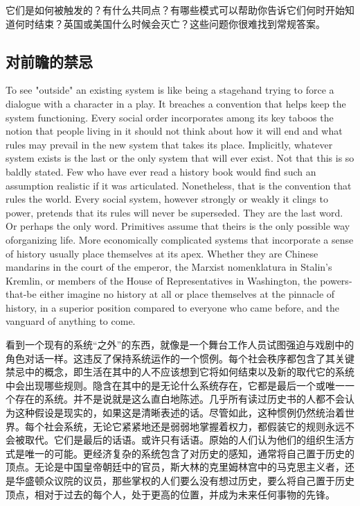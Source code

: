 \begin{Parallel}{97mm}{45mm}
  \ParallelRText
  {它们是如何被触发的？有什么共同点？有哪些模式可以帮助你告诉它们何时开始知道何时结束？英国或美国什么时候会灭亡？这些问题你很难找到常规答案。}

 \ParallelPar  

\subsection{对前瞻的禁忌}

  \ParallelLText
  {To see "outside" an existing system is like being a stagehand trying to force a dialogue with a character in a play. It breaches a convention that helps keep the system functioning. Every social order incorporates among its key taboos the notion that people living in it should not think about how it will end and what rules may prevail in the new system that takes its place. Implicitly, whatever system exists is the last or the only system that will ever exist. Not that this is so baldly stated. Few who have ever read a history book would find such an assumption realistic if it was articulated. Nonetheless, that is the convention that rules the world. Every social system, however strongly or weakly it clings to power, pretends that its rules will never be superseded. They are the last word. Or perhaps the only word. Primitives assume that theirs is the only possible way oforganizing life. More economically complicated systems that incorporate a sense of history usually place themselves at its apex. Whether they are Chinese mandarins in the court of the emperor, the Marxist nomenklatura in Stalin's Kremlin, or members of the House of Representatives in Washington, the powers-that-be either imagine no history at all or place themselves at the pinnacle of history, in a superior position compared to everyone who came before, and the vanguard of anything to come.}
  
  \ParallelRText
  {看到一个现有的系统“之外”的东西，就像是一个舞台工作人员试图强迫与戏剧中的角色对话一样。这违反了保持系统运作的一个惯例。每个社会秩序都包含了其关键禁忌中的概念，即生活在其中的人不应该想到它将如何结束以及新的取代它的系统中会出现哪些规则。隐含在其中的是无论什么系统存在，它都是最后一个或唯一一个存在的系统。并不是说就是这么直白地陈述。几乎所有读过历史书的人都不会认为这种假设是现实的，如果这是清晰表述的话。尽管如此，这种惯例仍然统治着世界。每个社会系统，无论它紧紧地还是弱弱地掌握着权力，都假装它的规则永远不会被取代。它们是最后的话语。或许只有话语。原始的人们认为他们的组织生活方式是唯一的可能。更经济复杂的系统包含了对历史的感知，通常将自己置于历史的顶点。无论是中国皇帝朝廷中的官员，斯大林的克里姆林宫中的马克思主义者，还是华盛顿众议院的议员，那些掌权的人们要么没有想过历史，要么将自己置于历史顶点，相对于过去的每个人，处于更高的位置，并成为未来任何事物的先锋。}
  \ParallelPar 


\end{Parallel}
